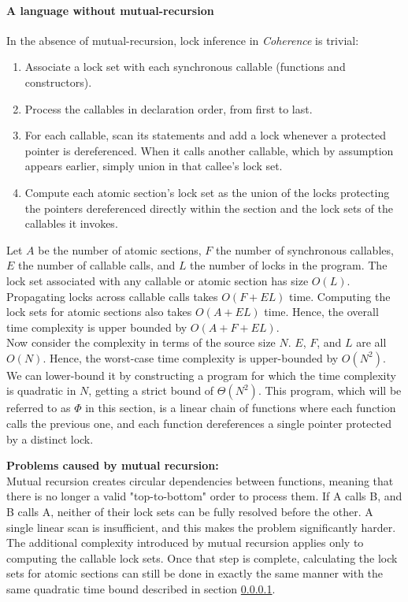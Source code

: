 \documentclass[a4paper,12pt,fleqn]{article}
\begin{document}
\paragraph{A language without mutual-recursion\\} \label{sec:without-mutual-recursion}
In the absence of mutual-recursion, lock inference in \textit{Coherence} is trivial:

\begin{enumerate}
\item Associate a lock set with each synchronous callable (functions and constructors).
\item Process the callables in declaration order, from first to last.
\item For each callable, scan its statements and add a lock whenever a protected pointer is dereferenced. When it calls another callable, which by assumption appears earlier, simply union in that callee's lock set.
\item Compute each atomic section's lock set as the union of the locks protecting the pointers dereferenced directly within the section and the lock sets of the callables it invokes.
\end{enumerate}

Let $A$ be the number of atomic sections, $F$ the number of synchronous callables, $E$ the number of callable calls, and $L$ the number of locks in the program. The lock set associated with any callable or atomic section has size $O(L)$. Propagating locks across callable calls takes $O(F + EL)$ time. Computing the lock sets for atomic sections also takes $O(A + EL)$ time. Hence, the overall time complexity is upper bounded by $O(A + F + EL)$.\\

Now consider the complexity in terms of the source size $N$. $E$, $F$, and $L$ are all $O(N)$. Hence, the worst-case time complexity is upper-bounded by $O(N^2)$. We can lower-bound it by constructing a program for which the time complexity is quadratic in $N$, getting a strict bound of $\Theta(N^2)$. This program, which will be referred to as $\Phi$ in this section, is a linear chain of functions where each function calls the previous one, and each function dereferences a single pointer protected by a distinct lock.

\begin{notebox}
\textbf{Problems caused by mutual recursion:\\}
Mutual recursion creates circular dependencies between functions, meaning that there is no longer a valid "top-to-bottom" order to process them. If A calls  B, and B calls A, neither of their lock sets can be fully resolved before the other. A single linear scan is insufficient, and this makes the problem significantly harder. The additional complexity introduced by mutual recursion applies only to computing the callable lock sets. Once that step is complete, calculating the lock sets for atomic sections can still be done in exactly the same manner with the same quadratic time bound described in section \ref{sec:without-mutual-recursion}.
\end{notebox}
\end{document}
